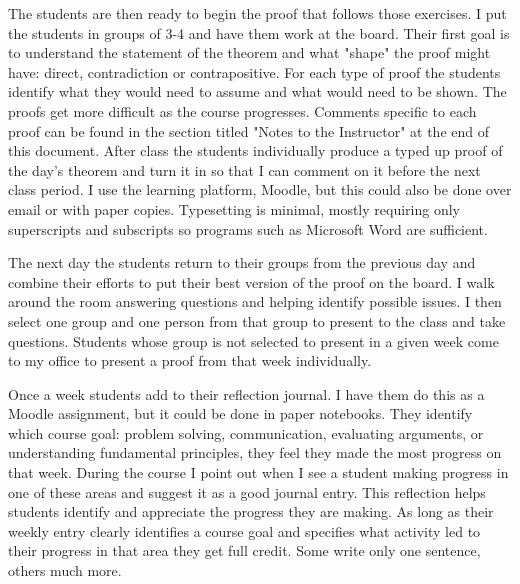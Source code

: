 \begin{annotation}
The students are then ready to begin the proof that follows those exercises. I put the students in groups of 3-4 and have them work at the board. Their first goal is to understand the statement of the theorem and what "shape" the proof might have: direct, contradiction or contrapositive. For each type of proof the students identify what they would need to assume and what would need to be shown. The proofs get more difficult as the course progresses. Comments specific to each proof can be found in the section titled "Notes to the Instructor" at the end of this document. After class the students individually produce a typed up proof of the day's theorem and turn it in so that I can comment on it before the next class period. I use the learning platform, Moodle, but this could also be done over email or with paper copies. Typesetting is minimal, mostly requiring only superscripts and subscripts so programs such as Microsoft Word are sufficient. 


The next day the students return to their groups from the previous day and combine their efforts to put their best version of the proof on the board. I walk around the room answering questions and helping identify possible issues. I then select one group and one person from that group to present to the class and take questions. Students whose group is not selected to present in a given week come to my office to present a proof from that week individually. 

Once a week students add to their reflection journal. I have them do this as a Moodle assignment, but it could be done in paper notebooks. They identify which course goal: problem solving, communication, evaluating arguments, or understanding fundamental principles, they feel they made the most progress on that week. During the course I point out when I see a student making progress in one of these areas and suggest it as a good journal entry. This reflection helps students identify and appreciate the progress they are making. As long as their weekly entry clearly identifies a course goal and specifies what activity led to their progress in that area they get full credit. Some write only one sentence, others much more.   


\end{annotation}
